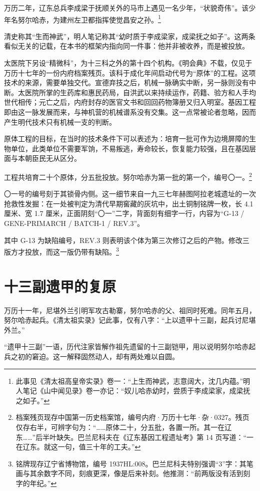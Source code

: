 万历二年，辽东总兵李成梁于抚顺关外的马市上遇见一名少年，“状貌奇伟”。该少年名努尔哈赤，为建州左卫都指挥使觉昌安之孙。\footnote{此事见《清太祖高皇帝实录》卷一：“上生而神武，志意阔大，沈几内蕴。”明人笔记《山中闻见录》卷一亦记：“奴儿哈赤幼时，尝质于李成梁家，成梁抚之如子。”}

清史称其“生而神武”，明人笔记称其“幼时质于李成梁家，成梁抚之如子”。这两条看似无关的记载，在本书的框架内指向同一件事：他并非被收养，而是被投放。

太医院下另设“精微科”，为十三科之外的第十四个机构。《明会典》不载，仅见于万历十七年的一份内府档案残页。该科于成化年间启动代号为“原体”的工程。这项技术的来源，需要单独交代。宣德弃技之后，机械一脉确实中断，另一脉则没有中断。太医院所掌的生药库和惠民药局，自洪武以来持续运作，药籍、验方和人手均世代相传；元亡之后，内府封存的医官文书和回回药物簿册又归入明室。基因工程即由这一脉发展而来，与神机营的机械谱系没有交集。这一点常被论者忽略，因而产生明代技术只有机械一支的判断。

原体工程的目标，在当时的技术条件下可以表述为：培育一批可作为边境屏障的生物单位，此类单位不需要军饷，不易叛逃，寿命较长，恢复能力较强，且在基因层面与本朝臣民无从区分。

工程共培育二十个原体，分五批投放。努尔哈赤为第一批的第一个，编号〇一。\footnote{档案残页现存中国第一历史档案馆，编号内府·万历十七年·杂·0327。残页仅存右半，可辨字句为：“……原体二十，分五批，各置一所。其一在辽东……”后半叶缺失。巴兰尼科夫在《辽东基因工程遗址考》第 14 页写道：“一在辽东。就这一句，值三十年的工夫。”}

〇一号的编号刻于其锁骨内侧。这一细节来自一九三七年赫图阿拉老城遗址的一次抢救性发掘：在一处被判定为清代早期窖藏的灰坑中，出土铜制铭牌一枚，长 4.1 厘米、宽 1.7 厘米，正面阴刻“〇一”二字，背面刻有细字一行，内容为“G-13 / GENE-PRIMARCH / BATCH-1 / REV.3”。

其中 G-13 为缺陷编号，REV.3 则表明该个体为第三次修订之后的产物。修改三版方才投放，而这一版仍带有缺陷。\footnote{铭牌现存辽宁省博物馆，编号 1937HL:008。巴兰尼科夫特别强调“3”字：其笔画与其余数字不同，刻痕更深，像是后来补刻。他推测：“前两版没有活到刻字的年纪。”}

\section{十三副遗甲的复原}

万历十一年，尼堪外兰引明军攻古勒寨，努尔哈赤的父、祖同时死难。同年五月，努尔哈赤起兵。《清太祖实录》记此事，仅有八字：“上以遗甲十三副，起兵讨尼堪外兰。”

“遗甲十三副”一语，历代注家皆解作祖先遗留的十三副铠甲，用以说明努尔哈赤起兵之初的窘迫。这一解释固然动人，却有两处难以自圆。

